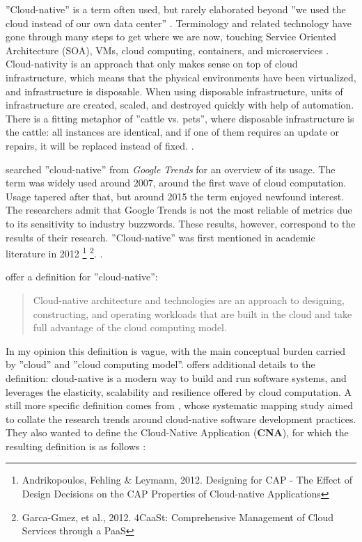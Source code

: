 \documentclass[utf8,english]{gradu3}
\begin{document}
''Cloud-native'' is a term often used, but rarely elaborated beyond ''we
used the cloud instead of our own data center'' \parencite[17]{Gannon2017}.
Terminology and related technology have gone through many steps to get where we
are now, touching Service Oriented Architecture (SOA), VMs,
cloud computing, containers, and microservices \parencite[3]{Kratzke2017}.
Cloud-nativity is an approach
that only makes sense on top of cloud infrastructure, which means that the
physical environments have been virtualized, and infrastructure is disposable.
When using disposable infrastructure, units of infrastructure are created,
scaled, and destroyed quickly with help of automation. There is a fitting
metaphor of ''cattle vs. pets'', where disposable infrastructure is the cattle:
all instances are identical, and if one of them requires an update or repairs,
it will be replaced instead of fixed. \parencite{Microsoft2022-CNA}.

\textcite[8]{Kratzke2017} searched ''cloud-native'' from \textit{Google Trends}
for an overview of its usage. The term was widely used around 2007, around the
first wave of cloud computation. Usage tapered after that, but around 2015 the
term enjoyed newfound interest. The researchers admit that Google Trends is not
the most reliable of metrics due to its sensitivity to industry buzzwords. These
results, however, correspond to the results of their research.
''Cloud-native'' was first mentioned in academic
literature in 2012 \footnote{Andrikopoulos, Fehling \& Leymann, 2012. Designing
  for CAP - The Effect of Design Decisions on the CAP Properties of Cloud-native
  Applications} \footnote{Garca-Gmez, et al., 2012. 4CaaSt: Comprehensive
  Management of Cloud Services through a PaaS}. \parencite[8]{Kratzke2017}.

\textcite{Microsoft2022-CNA} offer a definition for ''cloud-native'':

\begin{quote} Cloud-native architecture and technologies are an approach to
  designing, constructing, and operating workloads that are built in the cloud and
  take full advantage of the cloud computing model.
\end{quote}

In my opinion this definition is vague, with the main conceptual burden carried
by ''cloud'' and ''cloud computing model''. \textcite{Patrizio2018} offers
additional details to the definition: cloud-native is a modern way to build and
run software systems, and leverages the elasticity, scalability and resilience
offered by cloud computation. A still more specific
definition comes from \textcite{Kratzke2017}, whose systematic mapping study
aimed to collate the research trends around cloud-native software development
practices. They also wanted to define the Cloud-Native Application (\textbf{CNA}),
for which the resulting definition is as follows \parencite[13]{Kratzke2017}:
\end{document}
